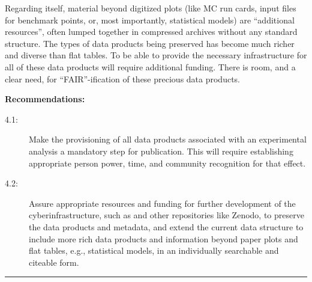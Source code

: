 \documentclass[11pt]{article}
\begin{document}
Regarding \hepdata itself, material beyond digitized plots (like MC run cards, input files for benchmark points, or, most importantly, statistical models) are ``additional resources'', often lumped together in compressed archives without any standard structure.
The types of data products being preserved has become much richer and diverse than flat tables.
To be able to provide the necessary infrastructure for all of these data products will require additional funding.
There is room, and a clear need, for ``FAIR''-ification of these precious data products. 

\noindent
\textbf{Recommendations:}
\begin{description}
  \item[4.1:] Make the provisioning of all data products associated with an experimental analysis a mandatory step for publication.
  This will require establishing appropriate person power, time, and community recognition for that effect.
   \item[4.2:] Assure appropriate resources and funding for further development of the cyberinfrastructure, such as \hepdata and other repositories like Zenodo, to preserve the data products and metadata, and extend the current data structure to include more rich data products and information beyond paper plots and flat tables, e.g., statistical models, in an individually searchable and citeable form.
\end{description}




\hrule 
\end{document}
